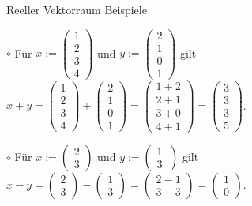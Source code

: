 \documentclass[
  8pt,
  ignorenonframetext,
]{beamer}
\begin{document}
\begin{frame}{Reeller Vektorraum}
\protect\hypertarget{reeller-vektorraum-3}{}
Beispiele \vspace{2mm}

\footnotesize

\(\circ\) Für \(x:= \begin{pmatrix} 1 \\ 2 \\ 3 \\ 4 \end{pmatrix}\) und
\(y:= \begin{pmatrix} 2 \\ 1 \\ 0 \\ 1 \end{pmatrix}\) gilt
\(x + y = \begin{pmatrix} 1 \\ 2 \\ 3 \\ 4 \end{pmatrix} + \begin{pmatrix} 2 \\ 1 \\ 0 \\ 1 \end{pmatrix} = \begin{pmatrix} 1 + 2 \\ 2 + 1 \\ 3 + 0\\ 4 + 1 \end{pmatrix} = \begin{pmatrix} 3 \\ 3\\ 3 \\ 5 \end{pmatrix}\).
\vspace{10mm}

\(\circ\) Für \(x:= \begin{pmatrix} 2 \\ 3 \end{pmatrix}\) und
\(y:= \begin{pmatrix} 1 \\ 3 \
\end{pmatrix}\) gilt
\(x - y = \begin{pmatrix} 2 \\ 3 \end{pmatrix} - \begin{pmatrix} 1 \\ 3 \end{pmatrix} = \begin{pmatrix} 2 - 1 \\ 3 - 3 \end{pmatrix} = \begin{pmatrix} 1 \\ 0 \end{pmatrix}\).
\vspace{10mm}


\end{frame}
\end{document}
